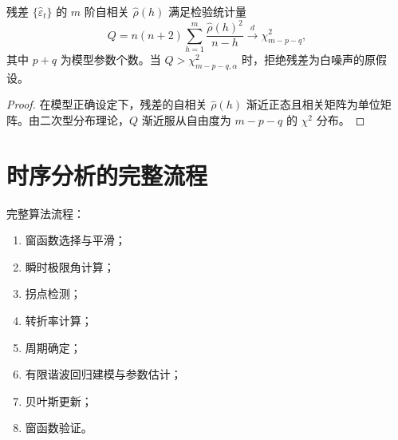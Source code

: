 \begin{theorem}\label{thm:ts_ljung_box}
残差 $\{\hat{\varepsilon}_t\}$ 的 $m$ 阶自相关 $\hat\rho(h)$ 满足检验统计量
\[
Q=n(n+2)\sum_{h=1}^m\frac{\hat\rho(h)^2}{n-h}\xrightarrow{d}\chi^2_{m-p-q},
\]
其中 $p+q$ 为模型参数个数。当 $Q>\chi^2_{m-p-q,\alpha}$ 时，拒绝残差为白噪声的原假设。
\end{theorem}

\begin{proof}
在模型正确设定下，残差的自相关 $\hat\rho(h)$ 渐近正态且相关矩阵为单位矩阵。由二次型分布理论，$Q$ 渐近服从自由度为 $m-p-q$ 的 $\chi^2$ 分布。
\end{proof}

\section{时序分析的完整流程}

\begin{definition}[时序分析算法流程]\label{def:ts_algorithm}
完整算法流程：
\begin{enumerate}[label=(\roman*)]
    \item 窗函数选择与平滑；
    \item 瞬时极限角计算；
    \item 拐点检测；
    \item 转折率计算；
    \item 周期确定；
    \item 有限谐波回归建模与参数估计；
    \item 贝叶斯更新；
    \item 窗函数验证。
\end{enumerate}
\end{definition}

